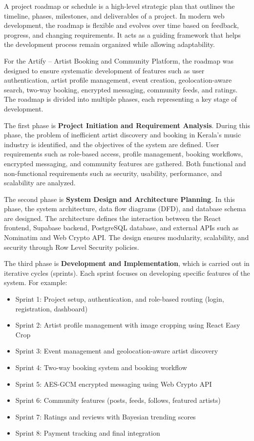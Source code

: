 \documentclass[12pt,a4paper]{report}
\begin{document}
A project roadmap or schedule is a high-level strategic plan that outlines the timeline, phases, milestones, and deliverables of a project. In modern web development, the roadmap is flexible and evolves over time based on feedback, progress, and changing requirements. It acts as a guiding framework that helps the development process remain organized while allowing adaptability.

For the Artify -- Artist Booking and Community Platform, the roadmap was designed to ensure systematic development of features such as user authentication, artist profile management, event creation, geolocation-aware search, two-way booking, encrypted messaging, community feeds, and ratings. The roadmap is divided into multiple phases, each representing a key stage of development.

The first phase is \textbf{Project Initiation and Requirement Analysis}. During this phase, the problem of inefficient artist discovery and booking in Kerala's music industry is identified, and the objectives of the system are defined. User requirements such as role-based access, profile management, booking workflows, encrypted messaging, and community features are gathered. Both functional and non-functional requirements such as security, usability, performance, and scalability are analyzed.

The second phase is \textbf{System Design and Architecture Planning}. In this phase, the system architecture, data flow diagrams (DFD), and database schema are designed. The architecture defines the interaction between the React frontend, Supabase backend, PostgreSQL database, and external APIs such as Nominatim and Web Crypto API. The design ensures modularity, scalability, and security through Row Level Security policies.

The third phase is \textbf{Development and Implementation}, which is carried out in iterative cycles (sprints). Each sprint focuses on developing specific features of the system. For example:

\begin{itemize}
\item Sprint 1: Project setup, authentication, and role-based routing (login, registration, dashboard)
\item Sprint 2: Artist profile management with image cropping using React Easy Crop
\item Sprint 3: Event management and geolocation-aware artist discovery
\item Sprint 4: Two-way booking system and booking workflow
\item Sprint 5: AES-GCM encrypted messaging using Web Crypto API
\item Sprint 6: Community features (posts, feeds, follows, featured artists)
\item Sprint 7: Ratings and reviews with Bayesian trending scores
\item Sprint 8: Payment tracking and final integration
\end{itemize}
\end{document}
